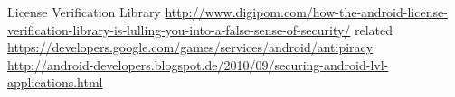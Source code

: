 License Verification Library\newline
\url{http://www.digipom.com/how-the-android-license-verification-library-is-lulling-you-into-a-false-sense-of-security/}\newline
related \url{https://developers.google.com/games/services/android/antipiracy}\newline
\url{http://android-developers.blogspot.de/2010/09/securing-android-lvl-applications.html}\newline
